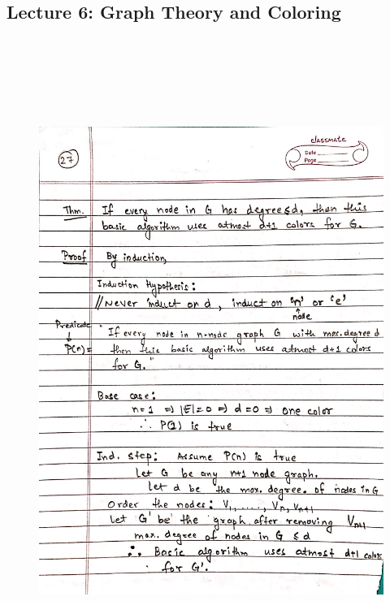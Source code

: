 \newpage
{\color{black} \subsection*{Lecture 6: Graph Theory and Coloring}}
\begin{figure}[H]
    \centering
    \includegraphics[width=16cm, height=21cm]{"./MIT-6.042J/MIT-6042J-027"}
\end{figure}

